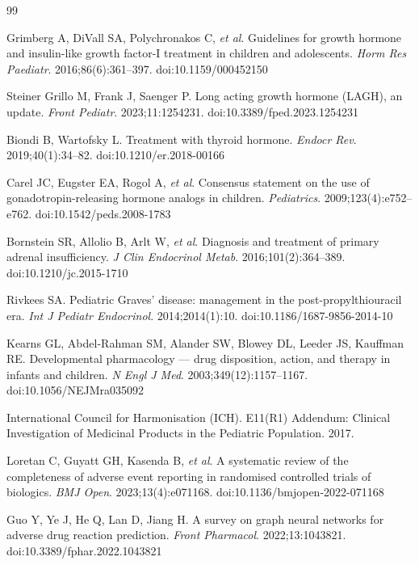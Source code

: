 \documentclass[10pt,twocolumn]{article}
\begin{document}
\renewcommand{\refname}{References}
\begin{thebibliography}{99}
 
Grimberg A, DiVall SA, Polychronakos C, \textit{et al}.
Guidelines for growth hormone and insulin-like growth factor-I treatment in children and adolescents.
\textit{Horm Res Paediatr}. 2016;86(6):361--397.
doi:10.1159/000452150
 
Steiner Grillo M, Frank J, Saenger P.
Long acting growth hormone (LAGH), an update.
\textit{Front Pediatr}. 2023;11:1254231.
doi:10.3389/fped.2023.1254231
 
Biondi B, Wartofsky L.
Treatment with thyroid hormone.
\textit{Endocr Rev}. 2019;40(1):34--82.
doi:10.1210/er.2018-00166
 
Carel JC, Eugster EA, Rogol A, \textit{et al}.
Consensus statement on the use of gonadotropin-releasing hormone analogs in children.
\textit{Pediatrics}. 2009;123(4):e752--e762.
doi:10.1542/peds.2008-1783
 
Bornstein SR, Allolio B, Arlt W, \textit{et al}.
Diagnosis and treatment of primary adrenal insufficiency.
\textit{J Clin Endocrinol Metab}. 2016;101(2):364--389.
doi:10.1210/jc.2015-1710
 
Rivkees SA.
Pediatric Graves' disease: management in the post-propylthiouracil era.
\textit{Int J Pediatr Endocrinol}. 2014;2014(1):10.
doi:10.1186/1687-9856-2014-10
 
Kearns GL, Abdel-Rahman SM, Alander SW, Blowey DL, Leeder JS, Kauffman RE.
Developmental pharmacology --- drug disposition, action, and therapy in infants and children.
\textit{N Engl J Med}. 2003;349(12):1157--1167.
doi:10.1056/NEJMra035092
 
International Council for Harmonisation (ICH).
E11(R1) Addendum: Clinical Investigation of Medicinal Products in the Pediatric Population. 2017.
 
Loretan C, Guyatt GH, Kasenda B, \textit{et al}.
A systematic review of the completeness of adverse event reporting in randomised controlled trials of biologics.
\textit{BMJ Open}. 2023;13(4):e071168.
doi:10.1136/bmjopen-2022-071168
 
Guo Y, Ye J, He Q, Lan D, Jiang H.
A survey on graph neural networks for adverse drug reaction prediction.
\textit{Front Pharmacol}. 2022;13:1043821.
doi:10.3389/fphar.2022.1043821
 

\end{thebibliography}
\end{document}
